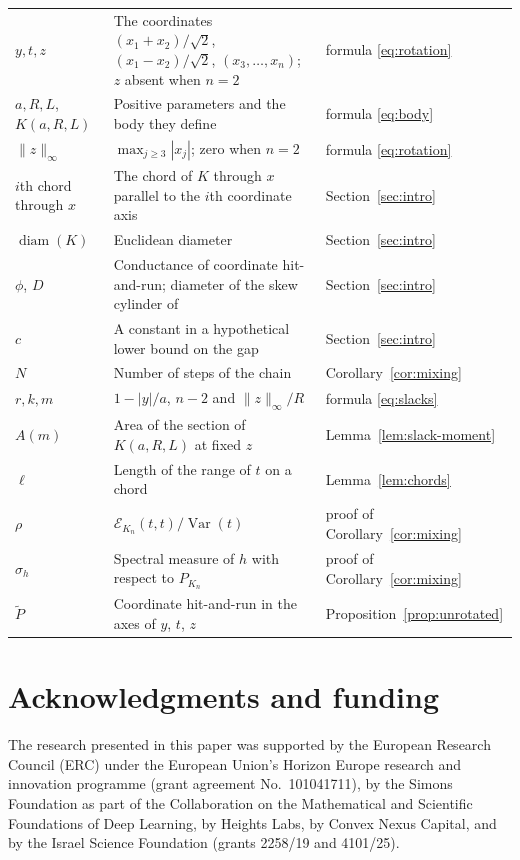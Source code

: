 \documentclass[11pt]{amsart}
\theoremstyle{remark}
\numberwithin{equation}{section}
\newcommand{\Var}{\operatorname{Var}}
\newcommand{\diam}{\operatorname{diam}}
\begin{document}
\begin{longtable}{@{}>{\raggedright\arraybackslash}p{}>{\raggedright\arraybackslash}p{}>{\raggedright\arraybackslash}p{}@{}}
$y,t,z$ & The coordinates $(x_1+x_2)/\sqrt2$, $(x_1-x_2)/\sqrt2$, $(x_3,\ldots,x_n)$; $z$ absent when $n=2$ & formula \eqref{eq:rotation}\\
$a,R,L$, $K(a,R,L)$ & Positive parameters and the body they define & formula \eqref{eq:body}\\
$\|z\|_\infty$ & $\max_{j\ge3}|x_j|$; zero when $n=2$ & formula \eqref{eq:rotation}\\
$i$th chord through $x$ & The chord of $K$ through $x$ parallel to the $i$th coordinate axis & Section~\ref{sec:intro}\\
$\diam(K)$ & Euclidean diameter & Section~\ref{sec:intro}\\
$\phi$, $D$ & Conductance of coordinate hit-and-run; diameter of the skew cylinder of~\cite{LV20} & Section~\ref{sec:intro}\\
$c$ & A constant in a hypothetical lower bound on the gap & Section~\ref{sec:intro}\\
$N$ & Number of steps of the chain & Corollary~\ref{cor:mixing}\\
$r,k,m$ & $1-|y|/a$, $n-2$ and $\|z\|_\infty/R$ & formula \eqref{eq:slacks}\\
$A(m)$ & Area of the section of $K(a,R,L)$ at fixed $z$ & Lemma~\ref{lem:slack-moment}\\
$\ell$ & Length of the range of $t$ on a chord & Lemma~\ref{lem:chords}\\
$\rho$ & $\mathcal E_{K_n}(t,t)/\Var(t)$ & proof of Corollary~\ref{cor:mixing}\\
$\sigma_h$ & Spectral measure of $h$ with respect to $P_{K_n}$ & proof of Corollary~\ref{cor:mixing}\\
$\widetilde P$ & Coordinate hit-and-run in the axes of $y$, $t$, $z$ & Proposition~\ref{prop:unrotated}\\
\bottomrule
\end{longtable}
\normalsize

\section*{Acknowledgments and funding}
The research presented in this paper was supported by the European Research Council (ERC) under the European Union's Horizon Europe research and innovation programme (grant agreement No.~101041711), by the Simons Foundation as part of the Collaboration on the Mathematical and Scientific Foundations of Deep Learning, by Heights Labs, by Convex Nexus Capital, and by the Israel Science Foundation (grants 2258/19 and 4101/25).
\end{document}
